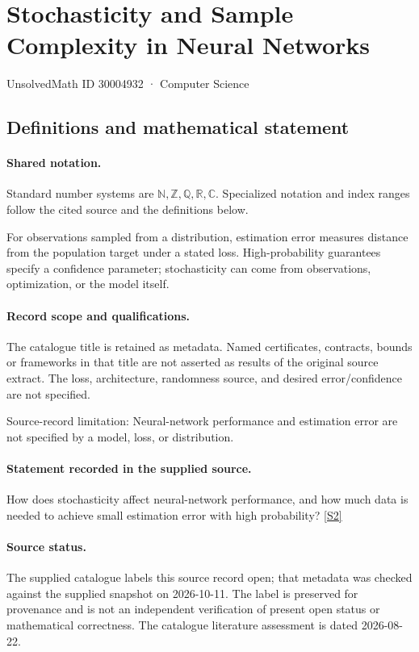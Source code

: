 \documentclass[11pt]{article}
\newcommand{\sref}[2]{\hyperlink{source:#1:#2}{[S#2]}}
\begin{document}
\setcounter{section}{30004931}
\section{Stochasticity and Sample Complexity in Neural Networks}\label{30004932}
{\small\sffamily UnsolvedMath ID 30004932 · Computer Science}
\subsection{Definitions and mathematical statement}

\paragraph{Shared notation.}Standard number systems are $\mathbb N,\mathbb Z,\mathbb Q,\mathbb R,\mathbb C$. Specialized notation and index ranges follow the cited source and the definitions below.


For observations sampled from a distribution, estimation error measures distance from the population target under a stated loss. High-probability guarantees specify a confidence parameter; stochasticity can come from observations, optimization, or the model itself.
\paragraph{Record scope and qualifications.}
The catalogue title is retained as metadata. Named certificates, contracts, bounds or frameworks in that title are not asserted as results of the original source extract.
The loss, architecture, randomness source, and desired error/confidence are not specified.

Source-record limitation: Neural-network performance and estimation error are not specified by a model, loss, or distribution.
\paragraph{Statement recorded in the supplied source.}
How does stochasticity affect neural-network performance, and how much data is needed to achieve small estimation error with high probability? \sref{30004932}{2}
\paragraph{Source status.}
The supplied catalogue labels this source record open; that metadata was checked against the supplied snapshot on 2026-10-11. The label is preserved for provenance and is not an independent verification of present open status or mathematical correctness. The catalogue literature assessment is dated 2026-08-22.
\end{document}
